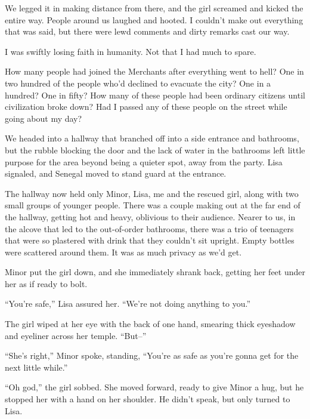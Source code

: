 We legged it in making distance from there, and the girl screamed and kicked the entire way.  People around us laughed and hooted.  I couldn't make out everything that was said, but there were lewd comments and dirty remarks cast our way.



I was swiftly losing faith in humanity.  Not that I had much to spare.



How many people had joined the Merchants after everything went to hell?  One in two hundred of the people who'd declined to evacuate the city?  One in a hundred?  One in fifty?  How many of these people had been ordinary citizens until civilization broke down?  Had I passed any of these people on the street while going about my day?



We headed into a hallway that branched off into a side entrance and bathrooms, but the rubble blocking the door and the lack of water in the bathrooms left little purpose for the area beyond being a quieter spot, away from the party.  Lisa signaled, and Senegal moved to stand guard at the entrance.



The hallway now held only Minor, Lisa, me and the rescued girl, along with two small groups of younger people.  There was a couple making out at the far end of the hallway, getting hot and heavy, oblivious to their audience.  Nearer to us, in the alcove that led to the out-of-order bathrooms, there was a trio of teenagers that were so plastered with drink that they couldn't sit upright.  Empty bottles were scattered around them.  It was as much privacy as we'd get.



Minor put the girl down, and she immediately shrank back, getting her feet under her as if ready to bolt.



``You're safe,'' Lisa assured her.  ``We're not doing anything to you.''



The girl wiped at her eye with the back of one hand, smearing thick eyeshadow and eyeliner across her temple.  ``But--''



``She's right,'' Minor spoke, standing, ``You're as safe as you're gonna get for the next little while.''



``Oh god,'' the girl sobbed.  She moved forward, ready to give Minor a hug, but he stopped her with a hand on her shoulder.  He didn't speak, but only turned to Lisa.



